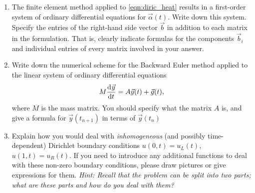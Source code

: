 \begin{enumerate}
\item The finite element method applied to \eqref{eqn:diric_heat} results in a first-order system of ordinary differential equations for $\vec{\alpha}(t)$. Write down this system.  Specify the entries of the right-hand side vector $\vec{b}$ in addition to each matrix in the formulation.  That is, clearly indicate formulas for the components $\vec{b}_i$ and individual entries of every matrix involved in your answer. 
\vspace{1em}
\item Write down the numerical scheme for the Backward Euler method applied to the linear system of ordinary differential equations 
\[
M\frac{{\rm d}^{} \vec{y}}{{\rm d} t^{}} = A\vec{y}(t) + \vec{g}(t),
\]
where $M$ is the mass matrix.  You should specify what the matrix $A$ is, and give a formula for $\vec{y}(t_{n+1})$ in terms of $\vec{y}(t_{n})$
\vspace{1em}
\item Explain how you would deal with \textit{inhomogeneous} (and possibly time-dependent) Dirichlet boundary conditions $u(0,t) = u_L(t)$, $u(1,t) = u_R(t)$.  
If you need to introduce any additional functions to deal with these non-zero boundary conditions, please draw pictures or give expressions for them.
\emph{Hint: Recall that the problem can be split into two parts; what are these parts and how do you deal with them?}


\end{enumerate}
